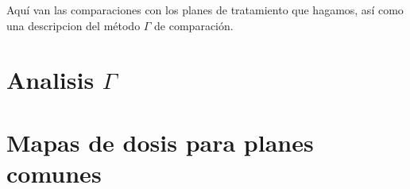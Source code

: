 Aquí van las comparaciones con los planes de tratamiento que hagamos, así como una descripcion del método $\Gamma$ de comparación.
\section{Analisis $\Gamma$}
\section{Mapas de dosis para planes comunes}